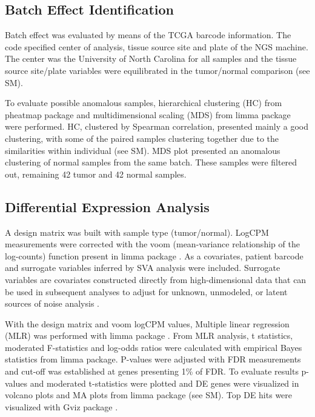 \documentclass[9pt,twocolumn,twoside]{gsajnl}
\begin{document}
\subsection*{Batch Effect Identification}

Batch effect was evaluated by means of the TCGA barcode information. The code specified center of analysis, tissue source site and plate of the NGS machine. The center was the University of North Carolina for all samples and the tissue source site/plate variables were equilibrated in the tumor/normal comparison (see SM).

To evaluate possible anomalous samples, hierarchical clustering (HC) from pheatmap \citep{pheatmap} package and multidimensional scaling (MDS) from limma \citep{limma} package were performed. HC, clustered by Spearman correlation, presented mainly a good clustering, with some of the paired samples clustering together due to the similarities within individual (see SM). MDS plot presented an anomalous clustering of normal samples from the same batch. These samples were filtered out, remaining 42 tumor and 42 normal samples.


\subsection*{Differential Expression Analysis}

A design matrix was built with sample type (tumor/normal). LogCPM measurements were corrected with the  voom (mean-variance relationship of the log-counts) function present in limma package \cite{voom}. As a covariates,  patient barcode and surrogate variables inferred by SVA analysis were included. Surrogate variables are covariates constructed directly from high-dimensional data that can be used in subsequent analyses to adjust for unknown, unmodeled, or latent sources of noise analysis \citep{Leek2012}.

With the design matrix and voom logCPM values, Multiple linear regression (MLR) was performed with limma package \citep{limma}. From MLR analysis, t statistics, moderated F-statistics and  log-odds ratios were calculated with empirical Bayes statistics from limma package. P-values were adjusted with FDR measurements and cut-off was established at genes presenting 1\% of FDR. To evaluate results p-values and moderated t-statistics were plotted and DE genes were visualized in volcano plots and  MA plots  from limma package (see SM). Top DE hits were visualized with Gviz package \citep{Gviz}.
\end{document}

